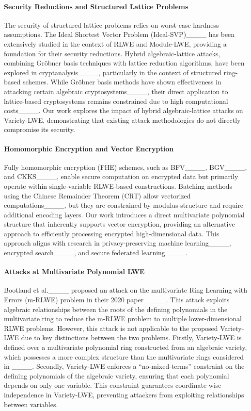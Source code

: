 \paragraph{Security Reductions and Structured Lattice Problems}  
The security of structured lattice problems relies on worst-case hardness assumptions. The Ideal Shortest Vector Problem (Ideal-SVP)____ has been extensively studied in the context of RLWE and Module-LWE, providing a foundation for their security reductions. Hybrid algebraic-lattice attacks, combining Gröbner basis techniques with lattice reduction algorithms, have been explored in cryptanalysis____, particularly in the context of structured ring-based schemes. While Gröbner basis methods have shown effectiveness in attacking certain algebraic cryptosystems____, their direct application to lattice-based cryptosystems remains constrained due to high computational costs____. Our work explores the impact of hybrid algebraic-lattice attacks on Variety-LWE, demonstrating that existing attack methodologies do not directly compromise its security.

\paragraph{Homomorphic Encryption and Vector Encryption}  
Fully homomorphic encryption (FHE) schemes, such as BFV____, BGV____, and CKKS____, enable secure computation on encrypted data but primarily operate within single-variable RLWE-based constructions. Batching methods using the Chinese Remainder Theorem (CRT) allow vectorized computations____, but they are constrained by modulus structure and require additional encoding layers. Our work introduces a direct multivariate polynomial structure that inherently supports vector encryption, providing an alternative approach to efficiently processing encrypted high-dimensional data. This approach aligns with research in privacy-preserving machine learning____, encrypted search____, and secure federated learning____. 


\paragraph{Attacks at Multivariate Polynomial LWE}
Bootland et al.____ proposed an attack on the multivariate Ring Learning with Errors (m-RLWE) problem in their 2020 paper ____. This attack exploits algebraic relationships between the roots of the defining polynomials in the multivariate ring to reduce the m-RLWE problem to multiple lower-dimensional RLWE problems. However, this attack is not applicable to the proposed Variety-LWE due to key distinctions between the two problems.
Firstly, Variety-LWE is defined over a multivariate polynomial ring constructed from an algebraic variety, which possesses a more complex structure than the multivariate rings considered in ____. Secondly, Variety-LWE enforces a ``no-mixed-terms'' constraint on the defining polynomials of the algebraic variety, ensuring that each polynomial depends on only one variable. This constraint guarantees coordinate-wise independence in Variety-LWE, preventing attackers from exploiting relationships between variables.